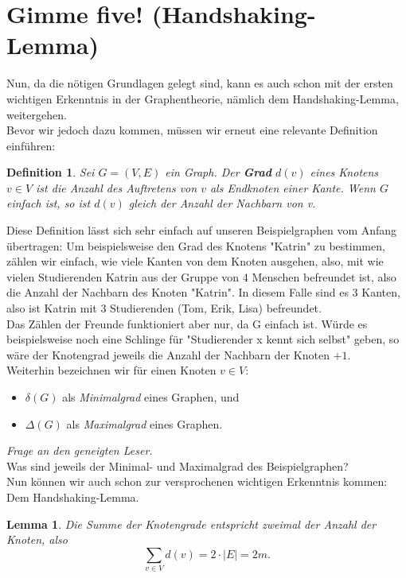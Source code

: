 \documentclass{article}
\newtheorem{definition}{Definition}
\newtheorem{lemma}{Lemma}
\begin{document}
\section{Gimme five! (Handshaking-Lemma)}
Nun, da die nötigen Grundlagen gelegt sind, kann es auch schon mit der ersten wichtigen Erkenntnis in der Graphentheorie, nämlich dem Handshaking-Lemma, weitergehen.\\
\bigskip
Bevor wir jedoch dazu kommen, müssen wir erneut eine relevante Definition einführen:\\
\bigskip
\begin{definition} Sei \(G = (V, E)\) ein Graph. Der \textbf{Grad} \(d(v)\) eines Knotens \(v \in V\) ist die Anzahl des Auftretens von \(v\) als Endknoten einer Kante. Wenn \(G\) einfach ist, so ist \(d(v)\) gleich der Anzahl der Nachbarn von v.
\end{definition}
\bigskip
Diese Definition lässt sich sehr einfach auf unseren Beispielgraphen vom Anfang übertragen: Um beispielsweise den Grad des Knotens "Katrin" zu bestimmen, zählen wir einfach, wie viele Kanten von dem Knoten ausgehen, also, mit wie vielen Studierenden Katrin aus der Gruppe von 4 Menschen befreundet ist, also die Anzahl der Nachbarn des Knoten "Katrin". In diesem Falle sind es \(3\) Kanten, also ist Katrin mit 3 Studierenden (Tom, Erik, Lisa) befreundet.\\
Das Zählen der Freunde funktioniert aber nur, da G einfach ist. Würde es beispielsweise noch eine Schlinge für "Studierender x kennt sich selbst" geben, so wäre der Knotengrad jeweils die Anzahl der Nachbarn der Knoten \(+1\).\\
\bigskip
Weiterhin bezeichnen wir für einen Knoten \(v \in V\):
\begin{itemize}
	\item \(\delta(G)\) als \textit{Minimalgrad} eines Graphen, und
	\item \(\Delta(G)\) als \textit{Maximalgrad} eines Graphen.
\end{itemize}
\textit{Frage an den geneigten Leser.}\\
Was sind jeweils der Minimal- und Maximalgrad des Beispielgraphen?\\
\bigskip
Nun können wir auch schon zur versprochenen wichtigen Erkenntnis kommen: Dem Handshaking-Lemma.\\
\begin{lemma}
Die Summe der Knotengrade entspricht zweimal der Anzahl der Knoten, also
\begin{equation*}
	\sum_{v \in V}d(v) = 2 \cdot |E| = 2m.
\end{equation*}
\end{lemma}
\end{document}
